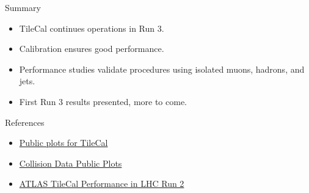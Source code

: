 \documentclass[presentation]{beamer}
\begin{document}
\begin{frame}{Summary}
    \begin{itemize}
        \item TileCal continues operations in Run 3.
        \item Calibration ensures good performance.
        \item Performance studies validate procedures using isolated muons, hadrons, and jets.
        \item First Run 3 results presented, more to come.
    \end{itemize}
\end{frame}

\begin{frame}{References}
    \begin{itemize}
        \item \href{https://twiki.cern.ch/twiki/bin/view/AtlasPublic/ApprovedPlotsTile}{Public plots for TileCal}
        \item \href{https://twiki.cern.ch/twiki/bin/view/AtlasPublic/TileCaloPublicResults}{Collision Data Public Plots}
        \item \href{https://arxiv.org/abs/2401.16034}{ATLAS TileCal Performance in LHC Run 2}
    \end{itemize}
\end{frame}
\end{document}
